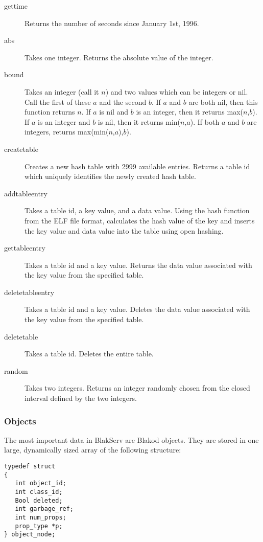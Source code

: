 \begin{description}
\item[gettime] Returns the number of seconds since January 1st, 1996.

\item[abs] Takes one integer.  Returns the absolute value of the integer.

\item[bound] Takes an integer (call it $n$) and two values which can be integers or nil.  
Call the first of these $a$ and the second $b$.  If $a$ and $b$ are both nil, then this
function returns $n$.  If $a$ is nil and $b$ is an integer, then it returns max($n$,$b$).
If $a$ is an integer and $b$ is nil, then it returns min($n$,$a$).  If both $a$ and $b$
are integers, returns max(min($n$,$a$),$b$).

\item[createtable] Creates a new hash table with 2999 available entries.  Returns a table
id which uniquely identifies the newly created hash table.

\item[addtableentry] Takes a table id, a key value, and a data value.  Using the
hash function from the ELF file format, calculates the hash value of the key and
inserts the key value and data value into the table using open hashing.

\item[gettableentry] Takes a table id and a key value.  Returns the data value
associated with the key value from the specified table.

\item[deletetableentry] Takes a table id and a key value.  Deletes the data value
associated with the key value from the specified table.

\item[deletetable] Takes a table id.  Deletes the entire table.
   
\item[random] Takes two integers.  Returns an integer randomly chosen from the closed
interval defined by the two integers.

\end{description}

\subsubsection{Objects}

The most important data in BlakServ are Blakod objects.  They are stored in one large,
dynamically sized array of the following structure:
\begin{verbatim}
typedef struct
{
   int object_id;
   int class_id;
   Bool deleted;
   int garbage_ref;
   int num_props;
   prop_type *p;
} object_node;
\end{verbatim}

